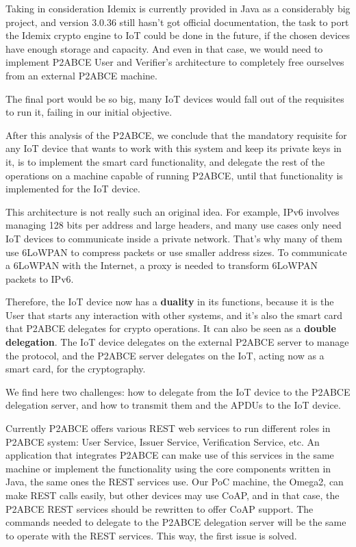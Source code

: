 Taking in consideration Idemix is currently provided in Java as a considerably big project, and version 3.0.36 still hasn't got official documentation, the task to port the Idemix crypto engine to IoT could be done in the future, if the chosen devices have enough storage and capacity. And even in that case, we would need to implement P2ABCE User and Verifier's architecture to completely free ourselves from an external P2ABCE machine.

The final port would be so big, many IoT devices would fall out of the requisites to run it, failing in our initial objective.

\hfil

After this analysis of the P2ABCE, we conclude that the mandatory requisite for any IoT device that wants to work with this system and keep its private keys in it, is to implement the smart card functionality, and delegate the rest of the operations on a machine capable of running P2ABCE, until that functionality is implemented for the IoT device. 


\hfil

This architecture is not really such an original idea. For example, IPv6 involves managing 128 bits per address and large headers, and many use cases only need IoT devices to communicate inside a private network. That's why many of them use 6LoWPAN to compress packets or use smaller address sizes. To communicate a 6LoWPAN with the Internet, a proxy is needed to transform 6LoWPAN packets to IPv6.

\hfil


Therefore, the IoT device now has a \textbf{duality} in its functions, because it is the User that starts any interaction with other systems, and it's also the smart card that P2ABCE delegates for crypto operations. It can also be seen as a \textbf{double delegation}. The IoT device delegates on the external P2ABCE server to manage the protocol, and the P2ABCE server delegates on the IoT, acting now as a smart card, for the cryptography.




\hfil

We find here two challenges: how to delegate from the IoT device to the P2ABCE delegation server, and how to transmit them and the APDUs to the IoT device.

Currently P2ABCE offers various REST web services to run different roles in P2ABCE system: User Service, Issuer Service, Verification Service, etc. An application that integrates P2ABCE can make use of this services in the same machine or implement the functionality using the core components written in Java, the same ones the REST services use. Our PoC machine, the Omega2, can make REST calls easily, but other devices may use \ac{CoAP}, and in that case, the P2ABCE REST services should be rewritten to offer CoAP support. The commands needed to delegate to the P2ABCE delegation server will be the same to operate with the REST services. This way, the first issue is solved.

